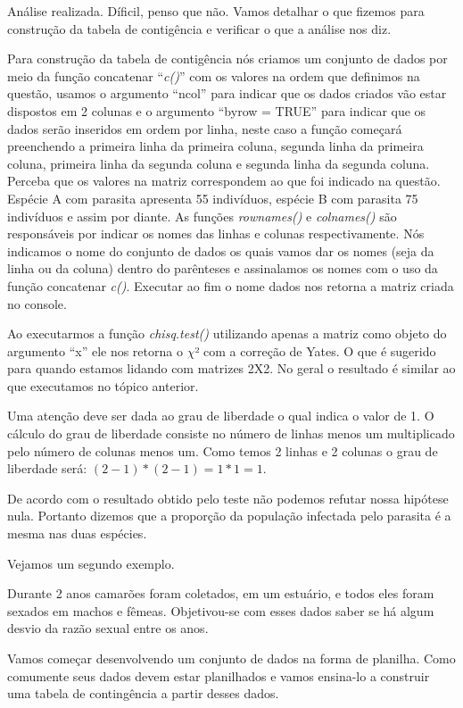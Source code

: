 \documentclass[titlepage, oneside, openany, a4paper]{book}
\begin{document}
Análise realizada. Díficil, penso que não. Vamos detalhar o que fizemos para construção da tabela de contigência e verificar o que a análise nos diz.

Para construção da tabela de contigência nós criamos um conjunto de dados por meio da função concatenar ``\emph{c()}'' com os valores na ordem que definimos na questão, usamos o argumento ``ncol'' para indicar que os dados criados vão estar dispostos em 2 colunas e o argumento ``byrow = TRUE'' para indicar que os dados serão inseridos em ordem por linha, neste caso a função começará preenchendo a primeira linha da primeira coluna, segunda linha da primeira coluna, primeira linha da segunda coluna e segunda linha da segunda coluna. Perceba que os valores na matriz correspondem ao que foi indicado na questão. Espécie A com parasita apresenta 55 indivíduos, espécie B com parasita 75 indivíduos e assim por diante. As funções \emph{rownames()} e \emph{colnames()} são responsáveis por indicar os nomes das linhas e colunas respectivamente. Nós indicamos o nome do conjunto de dados os quais vamos dar os nomes (seja da linha ou da coluna) dentro do parênteses e assinalamos os nomes com o uso da função concatenar \emph{c()}. Executar ao fim o nome dados nos retorna a matriz criada no console.

Ao executarmos a função \emph{chisq.test()} utilizando apenas a matriz como objeto do argumento ``x'' ele nos retorna o \(\chi\)² com a correção de Yates. O que é sugerido para quando estamos lidando com matrizes 2X2. No geral o resultado é similar ao que executamos no tópico anterior.

Uma atenção deve ser dada ao grau de liberdade o qual indica o valor de 1. O cálculo do grau de liberdade consiste no número de linhas menos um multiplicado pelo número de colunas menos um. Como temos 2 linhas e 2 colunas o grau de liberdade será: \((2-1)*(2-1) = 1*1 = 1\).

De acordo com o resultado obtido pelo teste não podemos refutar nossa hipótese nula. Portanto dizemos que a proporção da população infectada pelo parasita é a mesma nas duas espécies.

Vejamos um segundo exemplo.

Durante 2 anos camarões foram coletados, em um estuário, e todos eles foram sexados em machos e fêmeas. Objetivou-se com esses dados saber se há algum desvio da razão sexual entre os anos.

Vamos começar desenvolvendo um conjunto de dados na forma de planilha. Como comumente seus dados devem estar planilhados e vamos ensina-lo a construir uma tabela de contingência a partir desses dados.
\end{document}

